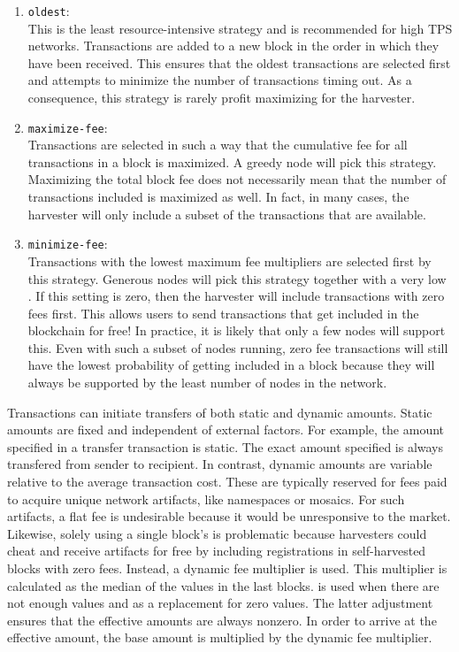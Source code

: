 \begin{enumerate}
	\item{\texttt{oldest}: \\
		This is the least resource-intensive strategy and is recommended for high TPS networks.
		Transactions are added to a new block in the order in which they have been received.
		This ensures that the oldest transactions are selected first and attempts to minimize the number of transactions timing out.
		As a consequence, this strategy is rarely profit maximizing for the harvester.
	}
	\item{\texttt{maximize-fee}: \\
		Transactions are selected in such a way that the cumulative fee for all transactions in a block is maximized.
		A greedy node will pick this strategy.
		Maximizing the total block fee does not necessarily mean that the number of transactions included is maximized as well.
		In fact, in many cases, the harvester will only include a subset of the transactions that are available.
	}
	\item{\texttt{minimize-fee}: \\
		Transactions with the lowest maximum fee multipliers are selected first by this strategy.
		Generous nodes will pick this strategy together with a very low .
		If this setting is zero, then the harvester will include transactions with zero fees first.
		This allows users to send transactions that get included in the blockchain for free!
		In practice, it is likely that only a few nodes will support this.
		Even with such a subset of nodes running, zero fee transactions will still have the lowest probability of getting included in a block because they will always be supported by the least number of nodes in the network.
	}
\end{enumerate}

Transactions can initiate transfers of both static and dynamic amounts.
Static amounts are fixed and independent of external factors.
For example, the amount specified in a transfer transaction is static.
The exact amount specified is always transfered from sender to recipient.
In contrast, dynamic amounts are variable relative to the average transaction cost.
These are typically reserved for fees paid to acquire unique network artifacts, like namespaces or mosaics.
For such artifacts, a flat fee is undesirable because it would be unresponsive to the market.
Likewise, solely using a single block's  is problematic because harvesters could cheat and receive artifacts for free by including registrations in self-harvested blocks with zero fees.
Instead, a dynamic fee multiplier is used.
This multiplier is calculated as the median of the  values in the last  blocks.
 is used when there are not enough values and as a replacement for zero values.
The latter adjustment ensures that the effective amounts are always nonzero.
In order to arrive at the effective amount, the base amount is multiplied by the dynamic fee multiplier.

